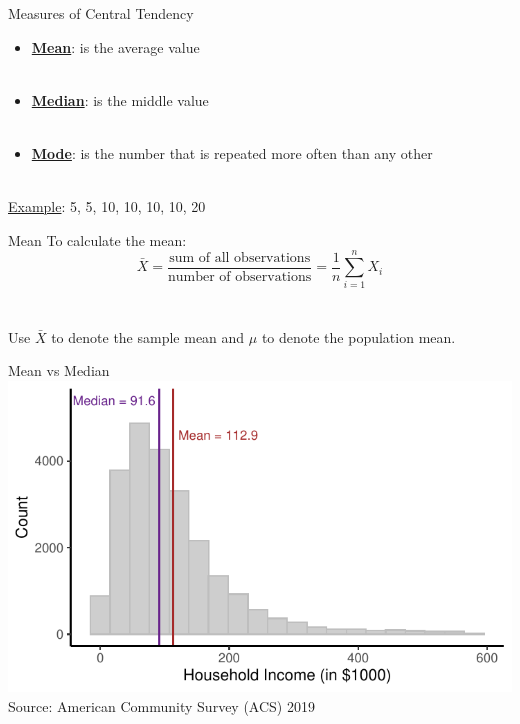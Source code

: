 \documentclass{./../div_teaching_slides}
\begin{document}
\begin{frame}{Measures of Central Tendency}
\begin{itemize}
\item[] \underline{\textbf{Mean}}: is the average value \\~\\ 
\item[] \underline{\textbf{Median}}: is the middle value \\~\\
\item[] \underline{\textbf{Mode}}: is the number that is repeated more often than any other \\~\\
\end{itemize} 
\underline{Example}: 5, 5, 10, 10, 10, 10, 20 
\end{frame}

\begin{frame}{Mean}
\vspace{1em}
To calculate the mean:
$$ \bar{X} = \frac{\text{sum of all observations}}{\text{number of observations}} = \frac{1}{n}\sum_{i=1}^n X_i $$ \\~\\
Use $\bar{X}$ to denote the sample mean and $\mu$ to denote the population mean. 
\end{frame}


\begin{frame}{Mean vs Median}
\centering
\vspace{-0.75em}
\includegraphics{./../../Output/hhi_hist_mean_med.pdf} \\
\scriptsize Source: American Community Survey (ACS) 2019
\end{frame}
\end{document}
